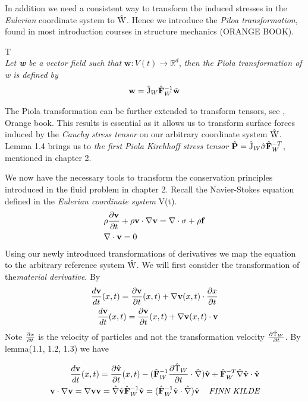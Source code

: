 In addition we need a consistent way to transform the induced stresses in the \textit{Eulerian} coordinate system to $\text{\^{W}}$. Hence we introduce the \textit{Piloa transformation}, found in most introduction courses in structure mechanics (ORANGE BOOK).
\\
\begin{lem}
T \\
\textit{Let \textbf{w} be a vector field such that} $\mathbf{w}: V(t) \rightarrow \mathbb{R}^d$, \textit{then the Piola transformation of w is defined by} 
\begin{align}
\mathbf{w} = \ha{J}_W \hat{F}^{-1}_W \hat{w}
\end{align} 
\end{lem}

The Piola transformation can be further extended to transform tensors, see \cite{Richter2016}, Orange book. This results is essential as it allows us to transform surface forces induced by the \textit{Cauchy stress tensor} on our arbitrary coordinate system $\text{\^{W}}$. Lemma 1.4 brings us to \textit{the first Piola Kirchhoff stress tensor} $\hat{P} = \ha{J}_W \hat{\sigma}\hat{F}_W^{-T}$, mentioned in chapter 2. 

We now have the necessary tools to transform the conservation principles introduced in the fluid problem in chapter 2. Recall the Navier-Stokes equation defined in the \textit{Eulerian coordinate system} V(t).
\begin{align*}
&\rho \frac{\partial \mathbf{v}}{\partial t} + \rho \mathbf{v} \cdot \nabla \mathbf{v} =
\nabla \cdot \sigma + \rho \mathbf{f} \\
&\nabla \cdot \mathbf{v} = 0
\end{align*}
Using our newly introduced transformations of derivatives we map the equation to the arbitrary reference system $\text{\^{W}}$. We will first consider the transformation of the\textit{material derivative}. By 
\begin{align*}
\frac{d \mathbf{v}}{dt}(x,t) = \frac{\partial \mathbf{v}}{\partial t}(x,t) + \nabla \mathbf{v}(x,t) \cdot \frac{\partial x}{\partial t} \\
\frac{d \mathbf{v}}{dt}(x,t) = \frac{\partial \mathbf{v}}{\partial t}(x,t) + \nabla \mathbf{v}(x,t) \cdot \mathbf{v}
\end{align*}
Note $\frac{\partial x}{\partial t}$ is the velocity of particles and not the transformation velocity $\frac{\partial \text{\^{T}}_W}{\partial t}$. By lemma(1.1, 1.2, 1.3) we have  

\begin{align*}
\frac{d \mathbf{v}}{dt}(x,t) = 
\pder{\hat{v}}{t}(x,t) - (\hat{F}_W^{-1}\pder{\ha{T}_W}{t} \cdot \hat{\nabla})\hat{v}
+ \hat{F}_W^{-T}\hat{\nabla}\hat{v} \cdot \hat{v} \\
\mathbf{v} \cdot \nabla \mathbf{v} = \nabla \mathbf{v} \mathbf{v} = 
\hat{\nabla}\hat{v}\hat{F}_W^{-1}\hat{v} = (\hat{F}_W^{-1}\hat{v} \cdot \hat{\nabla})\hat{v} \hspace{4mm} \textit{FINN KILDE}
\end{align*}

